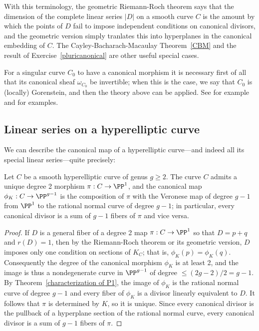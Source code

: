 With this terminology, the geometric Riemann-Roch theorem says that 
the dimension of the complete linear series $|D|$ on a smooth curve $C$
is the amount by which the points of $D$ fail to impose independent conditions
on canonical divisors, and the geometric version simply tranlates this into 
 hyperplanes in the canonical embedding of $C$. The Cayley-Bacharach-Macaulay
Theorem~\ref{CBM} and the result of Exercise~\ref{pluricanonical} are other useful
special cases.

\begin{remark}
For a singular curve $C_0$ to have a canonical morphism it is necessary first of all that its canonical sheaf
 $\omega_{C_0}$ be invertible; when this is the case, we say that $C_0$ is (locally) Gorenstein, and then
the theory above can be applied. See for example \cite{graphcurves} and \cite{ribbons} for examples. 
\end{remark}

\subsection{Linear series on a hyperelliptic curve}
We can describe the canonical map of a hyperelliptic curve---and indeed all its special linear series---quite precisely:

\begin{corollary}\label{canonical on hyperelliptic}
Let $C$ be a smooth hyperelliptic curve of genus $g\geq 2$. The curve $C$ admits a unique degree 2 morphism $\pi: C\to \PP^1$,
and the canonical map $\phi_K: C\to \PP^{g-1}$ is the composition of $\pi$ with the Veronese map of degree $g-1$ from
$\PP^1$ to the rational normal curve of degree $g-1$; in particular, every canonical divisor is a sum of $g-1$ fibers of $\pi$ and vice versa.
\end{corollary}

\begin{proof}
If $D$ is a general fiber of a degree 2 map $\pi:C\to \PP^1$ so that $D= p+q$ and $r(D) = 1$, then by the Riemann-Roch theorem or its geometric version, $D$ imposes only one condition on sections of $K_C$; that is, $\phi_K(p) = \phi_K(q)$. Consequently the degree of the canonical morphism $\phi_K$ is at least 2, and the image is thus a nondegenerate curve in $\PP^{g-1}$ of degree $\leq (2g-2)/2 = g-1$. By Theorem~\ref{characterization of P1}, the image of $\phi_K$ is the rational normal curve of degree $g-1$ and every fiber of $\phi_K$ is a divisor linearly equivalent to $D$. It follows that $\pi$ is determined by $K$, so it is unique. Since every canonical divisor is the pullback of a hyperplane section of the rational normal curve,
every canonical divisor is a sum of $g-1$ fibers of $\pi$.
\end{proof}


